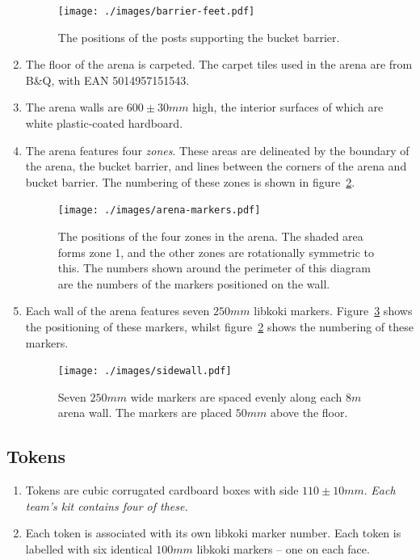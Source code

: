 \begin{enumerate}
  \begin{figure}
    \centering
    \texttt{[image: ./images/barrier-feet.pdf]}
    \caption{The positions of the posts supporting the bucket barrier.}
    \label{fig:bucket-barrier-legs}
  \end{figure}

\item The floor of the arena is carpeted.  The carpet tiles used in the arena are from B\&Q, with EAN 5014957151543.

\item The arena walls are $600\pm30mm$ high, the interior surfaces of which are white plastic-coated hardboard.

\item The arena features four \textit{zones}.  These areas are delineated by the boundary of the arena, the bucket barrier, and lines between the corners of the arena and bucket barrier.  The numbering of these zones is shown in figure~\ref{fig:arena-zones}.

  \begin{figure}
    \centering
    \texttt{[image: ./images/arena-markers.pdf]}
    \caption{The positions of the four zones in the arena.  The shaded area forms zone 1, and the other zones are rotationally symmetric to this.  The numbers shown around the perimeter of this diagram are the numbers of the markers positioned on the wall.}
    \label{fig:arena-zones}
  \end{figure}

\item Each wall of the arena features seven $250mm$ libkoki markers.  Figure~\ref{fig:arena-wall} shows the positioning of these markers, whilst figure~\ref{fig:arena-zones} shows the numbering of these markers.

  \begin{figure}
    \centering
    \texttt{[image: ./images/sidewall.pdf]}
    \caption{Seven $250mm$ wide markers are spaced evenly along each $8m$ arena wall.  The markers are placed $50mm$ above the floor.}
    \label{fig:arena-wall}
  \end{figure}

\end{enumerate}

\subsection{Tokens}
\label{sub:Tokens}
\begin {enumerate}
\item Tokens are cubic corrugated cardboard boxes with side $110 \pm 10 mm$.
\emph{Each team's kit contains four of these.}

\item Each token is associated with its own libkoki marker number.  Each token is labelled with six identical $100mm$ libkoki markers -- one on each face.
\end {enumerate}

